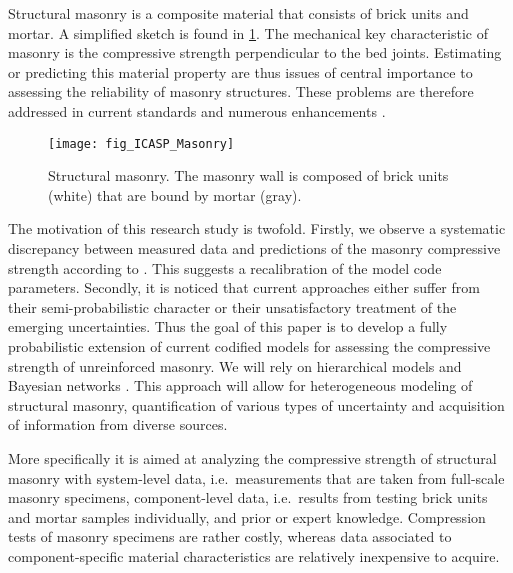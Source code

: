 Structural masonry is a composite material that consists of brick units and mortar.
A simplified sketch is found in \cref{fig:ICASP:Masonry}.
The mechanical key characteristic of masonry is the compressive strength perpendicular to the bed joints.
Estimating or predicting this material property are thus issues of central importance to assessing the reliability of masonry structures.
These problems are therefore addressed in current standards \cite{Standard:Eurocode6:1-1,Standard:JCSSProbabilisticCode} and numerous enhancements
\cite{Masonry:Dymiotis2002,Masonry:Glowienka2006,Masonry:Schueremans2006,Masonry:Mojsilovic2009,Masonry:Sykora2010,Masonry:GarzonRoca2013,Masonry:Sykora2014:a,Masonry:Sykora2014:b}.
\begin{figure}[tb]
  \centering
  \texttt{[image: fig\_ICASP\_Masonry]}
  \caption[Structural masonry]{Structural masonry.
           The masonry wall is composed of brick units (white) that are bound by mortar (gray).
          }
  \label{fig:ICASP:Masonry}
\end{figure}
\par %
The motivation of this research study is twofold.
Firstly, we observe a systematic discrepancy between measured data and predictions of the masonry compressive strength according to \cite{Standard:Eurocode6:1-1}.
This suggests a recalibration of the model code parameters.
Secondly, it is noticed that current approaches either suffer from their semi-probabilistic character or their unsatisfactory treatment of the emerging uncertainties.
Thus the goal of this paper is to develop a fully probabilistic extension of current codified models for assessing the compressive strength of unreinforced masonry.
We will rely on hierarchical models \cite{Nagel:JAIS2015,Nagel:PEM2016} and Bayesian networks \cite{Multilevel:Sankararaman2012,Bayesian:Urbina2012}.
This approach will allow for heterogeneous modeling of structural masonry, quantification of various types of uncertainty and acquisition of information from diverse sources.
\par %
More specifically it is aimed at analyzing the compressive strength of structural masonry with system-level data, i.e.\ measurements that are taken from full-scale masonry specimens,  
component-level data, i.e.\ results from testing brick units and mortar samples individually, and prior or expert knowledge.
Compression tests of masonry specimens are rather costly, whereas data associated to component-specific material characteristics are relatively inexpensive to acquire.
